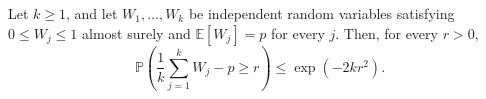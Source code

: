 Let \(k\geq1\), and let \(W_1,\ldots,W_k\) be independent random variables satisfying \(0\leq W_j\leq1\) almost surely and \(\mathbb E[W_j]=p\) for every \(j\).  Then, for every \(r>0\),
\[
 \mathbb P\!\left(\frac1k\sum_{j=1}^kW_j-p\geq r\right)\leq\exp(-2kr^2).
\]